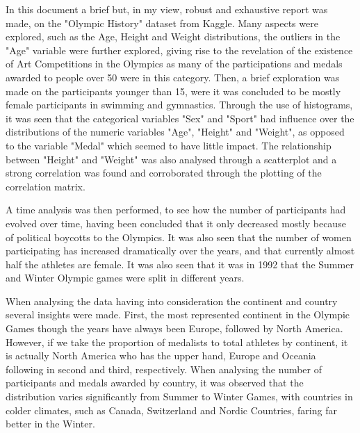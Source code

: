 \documentclass[11pt]{article} %
\begin{document}
In this document a brief but, in my view, robust and exhaustive report was made, on the "Olympic History" dataset from Kaggle. Many aspects were explored, such as the Age, Height and Weight distributions, the outliers in the "Age" variable were further explored, giving rise to the revelation of the existence of Art Competitions in the Olympics as many of the participations and medals awarded to people over 50 were in this category. Then, a brief exploration was made on the participants younger than 15, were it was concluded to be mostly female participants in swimming and gymnastics. Through the use of histograms, it was seen that the categorical variables "Sex" and "Sport" had influence over the distributions of the numeric variables "Age", "Height" and "Weight", as opposed to the variable "Medal" which seemed to have little impact. The relationship between "Height" and "Weight" was also analysed through a scatterplot and a strong correlation was found and corroborated through the plotting of the correlation matrix.

A time analysis was then performed, to see how the number of participants had evolved over time, having been concluded that it only decreased mostly because of political boycotts to the Olympics. It was also seen that the number of women participating has increased dramatically over the years, and that currently almost half the athletes are female. It was also seen that it was in 1992 that the Summer and Winter Olympic games were split in different years.

When analysing the data having into consideration the continent and country several insights were made. First, the most represented continent in the Olympic Games though the years have always been Europe, followed by North America. However, if we take the proportion of medalists to total athletes by continent, it is actually North America who has the upper hand, Europe and Oceania following in second and third, respectively. When analysing the number of participants and medals awarded by country, it was observed that the distribution varies significantly from Summer to Winter Games, with countries in colder climates, such as Canada, Switzerland and Nordic Countries, faring far better in the Winter.
\end{document}
